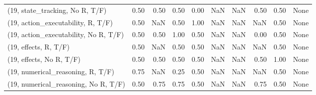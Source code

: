\begin{table*}[h!]
\begin{adjustbox}{width=2\columnwidth,center}
\begin{tabular}{lrrr|rrr|rrr}
(19, state\_tracking, No R, T/F)       &                      0.50 &                  0.50 &                      0.50 &                          0.00 &                       NaN &                           NaN &                                   0.50 &                               0.50 &                                  None \\
(19, action\_executability, R, T/F)    &                      0.50 &                   NaN &                      0.50 &                          1.00 &                       NaN &                           NaN &                                    NaN &                               0.50 &                                  None \\
(19, action\_executability, No R, T/F) &                      0.50 &                  0.50 &                      1.00 &                          0.50 &                       NaN &                           NaN &                                   0.00 &                               0.50 &                                  None \\
(19, effects, R, T/F)                 &                      0.50 &                   NaN &                      0.50 &                          0.50 &                       NaN &                           NaN &                                    NaN &                               0.50 &                                  None \\
(19, effects, No R, T/F)              &                      0.50 &                  0.50 &                      0.50 &                          0.50 &                       NaN &                           NaN &                                   0.50 &                               1.00 &                                  None \\
(19, numerical\_reasoning, R, T/F)     &                      0.75 &                   NaN &                      0.25 &                          0.50 &                       NaN &                           NaN &                                    NaN &                               0.50 &                                  None \\
(19, numerical\_reasoning, No R, T/F)  &                      0.50 &                  0.75 &                      0.75 &                          0.50 &                       NaN &                           NaN &                                   0.75 &                               0.50 &                                  None \\

\end{tabular}
\end{adjustbox}
\end{table*}
